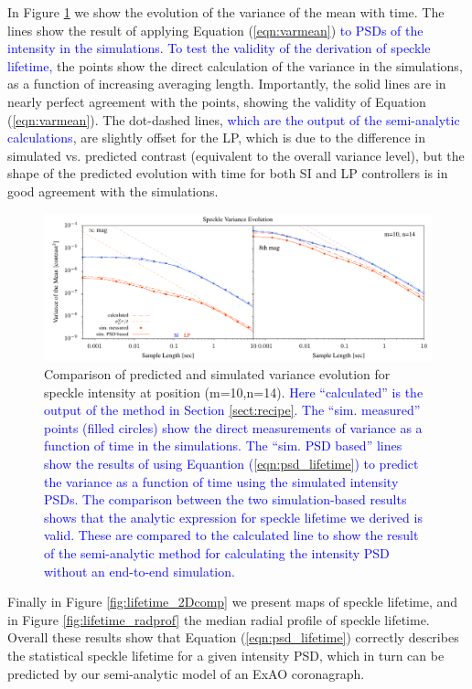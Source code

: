 \documentclass[10pt,preprint]{aastex631}
\newcommand{\jrmadd}[1]{\textcolor{blue}{#1}}
\begin{document}
In Figure \ref{fig:binvarcomp} we show the evolution of the variance of the mean with time.  The lines show the result of applying Equation (\ref{eqn:varmean})  \jrmadd{to PSDs of the intensity in the simulations}. \jrmadd{To test the validity of the derivation of speckle lifetime,} the points show the direct calculation of the variance in the simulations, as a function of increasing averaging length.   Importantly, the solid lines are in nearly perfect agreement with the points, showing the validity of Equation (\ref{eqn:varmean}).  The dot-dashed lines, \jrmadd{which are the output of the semi-analytic calculations}, are slightly offset for the LP, which is due to the difference in simulated vs. predicted contrast (equivalent to the overall variance level), but the shape of the predicted evolution with time for both SI and LP controllers is in good agreement with the simulations.

\begin{figure}
\hspace{-0.3in}
\includegraphics[width=6.5in]{binVarComp_lp_10_14.pdf}
\caption{Comparison of predicted and simulated variance evolution for speckle intensity at position (m=10,n=14).  \jrmadd{Here ``calculated'' is the output of the method in Section \ref{sect:recipe}.  The ``sim. measured'' points (filled circles) show the direct measurements of variance as a function of time in the simulations.  The ``sim. PSD based'' lines show the results of using Equantion (\ref{eqn:psd_lifetime}) to predict the variance as a function of time using the simulated intensity PSDs.  The comparison between the two simulation-based results shows that the analytic expression for speckle lifetime we derived is valid.  These are compared to the calculated line to show the result of the semi-analytic method for calculating the intensity PSD without an end-to-end simulation.}  \label{fig:binvarcomp}}
\end{figure}

Finally in Figure \ref{fig:lifetime_2Dcomp} we present maps of speckle lifetime, and in Figure \ref{fig:lifetime_radprof} the median radial profile of speckle lifetime.  Overall these results show that Equation (\ref{eqn:psd_lifetime}) correctly describes the statistical speckle lifetime for a given intensity PSD, which in turn can be predicted by our semi-analytic model of an ExAO coronagraph.
\end{document}
